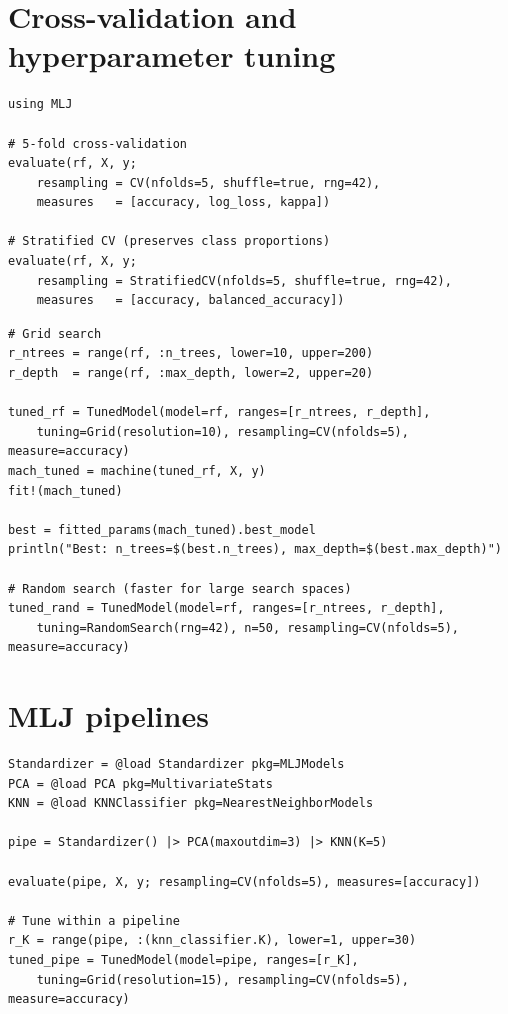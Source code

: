 \section{Cross-validation and hyperparameter tuning}

\begin{verbatim}
using MLJ

# 5-fold cross-validation
evaluate(rf, X, y;
    resampling = CV(nfolds=5, shuffle=true, rng=42),
    measures   = [accuracy, log_loss, kappa])

# Stratified CV (preserves class proportions)
evaluate(rf, X, y;
    resampling = StratifiedCV(nfolds=5, shuffle=true, rng=42),
    measures   = [accuracy, balanced_accuracy])
\end{verbatim}

\begin{verbatim}
# Grid search
r_ntrees = range(rf, :n_trees, lower=10, upper=200)
r_depth  = range(rf, :max_depth, lower=2, upper=20)

tuned_rf = TunedModel(model=rf, ranges=[r_ntrees, r_depth],
    tuning=Grid(resolution=10), resampling=CV(nfolds=5), measure=accuracy)
mach_tuned = machine(tuned_rf, X, y)
fit!(mach_tuned)

best = fitted_params(mach_tuned).best_model
println("Best: n_trees=$(best.n_trees), max_depth=$(best.max_depth)")

# Random search (faster for large search spaces)
tuned_rand = TunedModel(model=rf, ranges=[r_ntrees, r_depth],
    tuning=RandomSearch(rng=42), n=50, resampling=CV(nfolds=5), measure=accuracy)
\end{verbatim}

\section{MLJ pipelines}

\begin{verbatim}
Standardizer = @load Standardizer pkg=MLJModels
PCA = @load PCA pkg=MultivariateStats
KNN = @load KNNClassifier pkg=NearestNeighborModels

pipe = Standardizer() |> PCA(maxoutdim=3) |> KNN(K=5)

evaluate(pipe, X, y; resampling=CV(nfolds=5), measures=[accuracy])

# Tune within a pipeline
r_K = range(pipe, :(knn_classifier.K), lower=1, upper=30)
tuned_pipe = TunedModel(model=pipe, ranges=[r_K],
    tuning=Grid(resolution=15), resampling=CV(nfolds=5), measure=accuracy)
\end{verbatim}

